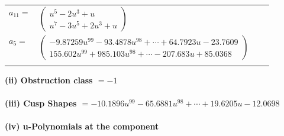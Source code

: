 \documentclass[1p]{elsarticle_modified}
\theoremstyle{definition}
\begin{document}
\begin{tabular}{m{7pt} m{180pt} m{7pt} m{180pt} }
\flushright $a_{11}=$&$\begin{pmatrix}u^5-2 u^3+u\\u^7-3 u^5+2 u^3+u\end{pmatrix}$ \\
\flushright $a_{5}=$&$\begin{pmatrix}-9.87259 u^{99}-93.4878 u^{98}+\cdots+64.7923 u-23.7609\\155.602 u^{99}+985.103 u^{98}+\cdots-207.683 u+85.0368\end{pmatrix}$\\&\end{tabular}
\flushleft \textbf{(ii) Obstruction class $= -1$}\\~\\
\flushleft \textbf{(iii) Cusp Shapes $= -10.1896 u^{99}-65.6881 u^{98}+\cdots+19.6205 u-12.0698$}\\~\\
\newpage\renewcommand{\arraystretch}{1}
\flushleft \textbf{(iv) u-Polynomials at the component}\newline \\
\end{document}
